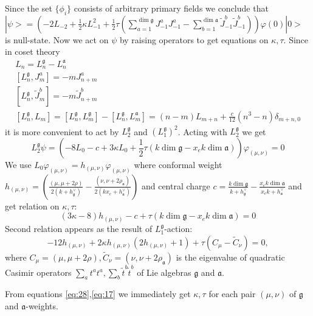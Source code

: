 \documentclass[a4paper]{article}
\theoremstyle{definition}
\newcommand{\gf}{\mathfrak{g}}
\newcommand{\af}{\mathfrak{a}}
\theoremstyle{definition} \newtheorem{Def}{Definition}
\begin{document}
Since the set $\{\phi_{i}\}$ consists of arbitrary primary fields we conclude that $|\psi>=\left(-2L_{-2}+\frac{1}{2}\kappa L_{-1}^{2}+\frac{1}{2}\tau \left(\sum_{a=1}^{\dim\gf}J^{a}_{-1}J^{a}_{-1}-\sum_{b=1}^{\dim\af}\tilde{J}^{b}_{-1}\tilde{J}^{b}_{-1}\right)\right)\varphi(0)|0>$ is null-state. Now we act on $\psi$ by raising operators to get equations on $\kappa,\tau$. Since in coset theory
\begin{equation}
  \label{eq:18}
\begin{array}{l}
  L_{n}=L_{n}^{\gf}-L_{n}^{\af}\\
  \left[L_{n}^{\gf},J^{a}_{m}\right]=-m J^{a}_{n+m}\\
  \left[L_{n}^{\gf},\tilde{J}^{b}_{m}\right]=-m\tilde{J}^{b}_{n+m}\\
  \left[L_{n}^{\gf},L_{m}\right]=[L_{n}^{\gf},L_{m}^{\gf}]-[L_{n}^{\gf},L_{m}^{\af}]=(n-m)L_{m+n}+\frac{c}{12}(n^{3}-n)\delta_{m+n,0}
\end{array}
\end{equation}
 it is more convenient to act by $L_{2}^{\gf}$ and $\left(L_{1}^{\gf}\right)^{2}$. 
 Acting with $L_{2}^{\gf}$ we get
\begin{equation*}
  L_{2}^{\gf}\psi= \left(-8 L_{0}-c+ 3 \kappa L_{0}+\frac{1}{2}\tau (k \dim\gf-x_{e}k\dim\af)\right) \varphi_{(\mu,\nu)}=0
\end{equation*}
We use $L_{0} \varphi_{(\mu,\nu)}=h_{(\mu,\nu)} \varphi_{(\mu,\nu)}$ where conformal weight $h_{(\mu,\nu)}= \left(\frac{(\mu,\mu+2\rho)}{2(k+h^{\vee}_{\gf})}-\frac{(\nu,\nu+2\rho_{\af})}{2(k x_{e}+h^{\vee}_{\af})}\right)$ and central charge $c=\frac{k\dim \gf}{k+h^{\vee}_{\gf}}-\frac{x_{e}k\dim \af}{x_{e} k+h^{\vee}_{\af}}$ and get relation on $\kappa,\tau$:
\begin{equation}
  \label{eq:28} (3\kappa-8)h_{(\mu,\nu)}-c+\tau (k\dim\gf-x_{e}k\dim\af) =0
\end{equation}
Second relation appears as the result of $L_{1}^{\gf}$-action:
\begin{equation}
  \label{eq:21}
 -12 h_{(\mu,\nu)}+2\kappa h_{(\mu,\nu)} (2h_{(\mu,\nu)}+1) + \tau
(C_{\mu}-\tilde{C}_{\nu})=0,
\end{equation}
 where $C_{\mu}=(\mu,\mu+2\rho), \tilde{C}_{\nu}=(\nu,\nu+2\rho_{\af})$ is the eigenvalue of quadratic Casimir operators $\sum_{a}t^{a}t^{a}, \sum_{b}\tilde{t}^{b}\tilde{t}^{b}$ of Lie algebras $\gf$ and $\af$.

From equations \eqref{eq:28},\eqref{eq:17} we immediately get $\kappa,\tau$ for each pair $(\mu,\nu)$ of $\gf$ and $\af$-weights. 
\end{document}
